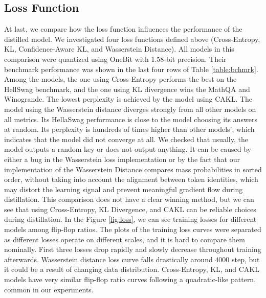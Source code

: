 \documentclass{article}
\begin{document}
\subsection{Loss Function}
At last, we compare how the loss function influences the performance of the distilled model. We investigated four loss functions defined above (Cross-Entropy, KL, Confidence-Aware KL, and Wasserstein Distance). All models in this comparison were quantized using OneBit with 1.58-bit precision. Their benchmark performance was shown in the last four rows of Table \ref{table:bchmrk}. Among the models, the one using Cross-Entropy performs the best on the HellSwag benchmark, and the one using KL divergence wins the MathQA and Winogrande. The lowest perplexity is achieved by the model using CAKL. The model using the Wasserstein distance diverges strongly from all other models on all metrics. Its HellaSwag performance is close to the model choosing its answers at random. Its perplexity is hundreds of times higher than other models', which indicates that the model did not converge at all. We checked that usually, the model outputs a random key or does not output anything. It can be caused by either a bug in the Wasserstein loss implementation or by the fact that our implementation of the Wasserstein Distance compares mass probabilities in sorted order, without taking into account the alignment between token identities, which may distort the learning signal and prevent meaningful gradient flow during distillation. This comparison does not have a clear winning method, but we can see that using Cross-Entropy, KL Divergence, and CAKL can be reliable choices during distillation. In the Figure \ref{fig:loss}, we can see training losses for different models among flip-flop ratios. The plots of the training loss curves were separated as different losses operate on different scales, and it is hard to compare them nominally. First three losses drop rapidly and slowly decrease throughout training afterwards. Wasserstein distance loss curve falls drastically around \(4000\) step, but it could be a result of changing data distribution. Cross-Entropy, KL, and CAKL models have very similar flip-flop ratio curves following a quadratic-like pattern, common in our experiments.
\end{document}
